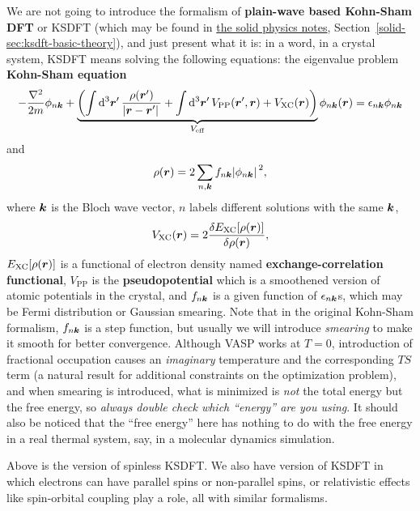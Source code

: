 \documentclass[hyperref, a4paper]{article}
\newcommand*{\concept}[1]{{\textbf{#1}}}
\begin{document}
We are not going to introduce the formalism of \concept{plain-wave based Kohn-Sham DFT} or KSDFT (which may be found in \href{../../solid/solid}{the solid physics notes}, Section~\ref{solid-sec:ksdft-basic-theory}), and just present what it is: in a word, in a crystal system, KSDFT means solving the following equations: the eigenvalue problem \concept{Kohn-Sham equation}
\begin{equation}
    - \frac{\laplacian}{2m} \phi_{n \vb*{k}} + \underbrace{\left( \int \dd[3]{\vb*{r}'} \frac{\rho(\vb*{r}')}{\abs*{\vb*{r} - \vb*{r}'}} + \int \dd[3]{\vb*{r}'} V_\text{PP}(\vb*{r}', \vb*{r}) + V_\text{XC}(\vb*{r}) \right)}_{V_\text{eff}} \phi_{n \vb*{k}}(\vb*{r}) = \epsilon_{n \vb*{k}} \phi_{n \vb*{k}}
\end{equation}
and
\begin{equation}
    \rho(\vb*{r}) = 2 \sum_{n, \vb*{k}} f_{n \vb*{k}} \abs*{\phi_{n \vb*{k}}}^2,
\end{equation}
where $\vb*{k}$ is the Bloch wave vector, $n$ labels different solutions with the same $\vb*{k}$,
\begin{equation}
    V_\text{XC}(\vb*{r}) = 2 \fdv{E_\text{XC}[\rho(\vb*{r})]}{\rho(\vb*{r})},
\end{equation}
$E_\text{XC}[\rho(\vb*{r})]$ is a functional of electron density named \concept{exchange-correlation functional}, 
$V_\text{PP}$ is the \concept{pseudopotential} which is a smoothened version of atomic potentials in the crystal,
and $f_{n \vb*{k}}$ is a given function of $\epsilon_{n \vb*{k}}$s, which may be Fermi distribution or Gaussian smearing.
Note that in the original Kohn-Sham formalism, $f_{n \vb*{k}}$ is a step function, but usually we will introduce \emph{smearing} to make it smooth for better convergence.
Although VASP works at $T=0$, introduction of fractional occupation causes an \emph{imaginary} temperature and the corresponding $TS$ term (a natural result for additional constraints on the optimization problem), and when smearing is introduced, what is minimized is \emph{not} the total energy but the free energy, so \emph{always double check which ``energy'' are you using}.
It should also be noticed that the ``free energy'' here has nothing to do with the free energy in a real thermal system, say, in a molecular dynamics simulation.

Above is the version of spinless KSDFT. We also have version of KSDFT in which electrons can have parallel spins or non-parallel spins, or relativistic effects like spin-orbital coupling play a role, all with similar formalisms.
\end{document}
